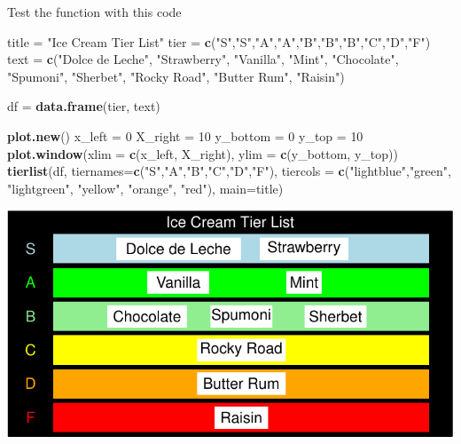 \documentclass[
]{article}
\newenvironment{Shaded}{\begin{snugshade}}{\end{snugshade}}
\newcommand{\AttributeTok}[1]{\textcolor[rgb]{0.13,0.29,0.53}{#1}}
\newcommand{\DecValTok}[1]{\textcolor[rgb]{0.00,0.00,0.81}{#1}}
\newcommand{\FunctionTok}[1]{\textcolor[rgb]{0.13,0.29,0.53}{\textbf{#1}}}
\newcommand{\NormalTok}[1]{#1}
\newcommand{\OtherTok}[1]{\textcolor[rgb]{0.56,0.35,0.01}{#1}}
\newcommand{\StringTok}[1]{\textcolor[rgb]{0.31,0.60,0.02}{#1}}
\begin{document}
Test the function with this code

\begin{Shaded}
\begin{Highlighting}[]
\NormalTok{title }\OtherTok{=} \StringTok{"Ice Cream Tier List"}
\NormalTok{tier }\OtherTok{=} \FunctionTok{c}\NormalTok{(}\StringTok{"S"}\NormalTok{,}\StringTok{"S"}\NormalTok{,}\StringTok{"A"}\NormalTok{,}\StringTok{"A"}\NormalTok{,}\StringTok{"B"}\NormalTok{,}\StringTok{"B"}\NormalTok{,}\StringTok{"B"}\NormalTok{,}\StringTok{"C"}\NormalTok{,}\StringTok{"D"}\NormalTok{,}\StringTok{"F"}\NormalTok{)}
\NormalTok{text }\OtherTok{=} \FunctionTok{c}\NormalTok{(}\StringTok{"Dolce de Leche"}\NormalTok{, }\StringTok{"Strawberry"}\NormalTok{,}
         \StringTok{"Vanilla"}\NormalTok{, }\StringTok{"Mint"}\NormalTok{, }
         \StringTok{"Chocolate"}\NormalTok{, }\StringTok{"Spumoni"}\NormalTok{, }\StringTok{"Sherbet"}\NormalTok{,}
         \StringTok{"Rocky Road"}\NormalTok{, }\StringTok{"Butter Rum"}\NormalTok{, }\StringTok{"Raisin"}\NormalTok{)}

\NormalTok{df }\OtherTok{=} \FunctionTok{data.frame}\NormalTok{(tier, text)}

  \FunctionTok{plot.new}\NormalTok{()}
\NormalTok{  x\_left }\OtherTok{=} \DecValTok{0}
\NormalTok{  X\_right }\OtherTok{=} \DecValTok{10}
\NormalTok{  y\_bottom }\OtherTok{=} \DecValTok{0}
\NormalTok{  y\_top }\OtherTok{=} \DecValTok{10}
  \FunctionTok{plot.window}\NormalTok{(}\AttributeTok{xlim =} \FunctionTok{c}\NormalTok{(x\_left, X\_right), }\AttributeTok{ylim =} \FunctionTok{c}\NormalTok{(y\_bottom, y\_top))}
  \FunctionTok{tierlist}\NormalTok{(df, }\AttributeTok{tiernames=}\FunctionTok{c}\NormalTok{(}\StringTok{"S"}\NormalTok{,}\StringTok{"A"}\NormalTok{,}\StringTok{"B"}\NormalTok{,}\StringTok{"C"}\NormalTok{,}\StringTok{"D"}\NormalTok{,}\StringTok{"F"}\NormalTok{), }
                    \AttributeTok{tiercols =} \FunctionTok{c}\NormalTok{(}\StringTok{"lightblue"}\NormalTok{,}\StringTok{"green"}\NormalTok{, }\StringTok{"lightgreen"}\NormalTok{, }\StringTok{"yellow"}\NormalTok{, }\StringTok{"orange"}\NormalTok{, }\StringTok{"red"}\NormalTok{),}
                    \AttributeTok{main=}\NormalTok{title)}
\end{Highlighting}
\end{Shaded}

\includegraphics{Assignment1_Rcode_files/figure-latex/unnamed-chunk-3-1.pdf}
\end{document}
